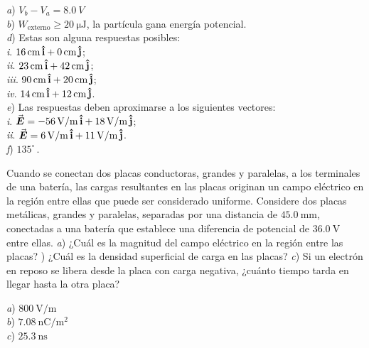 \begin{Answer}
	\begin{minipage}[t]{.4\textwidth}
    \textit{a}) $V_b-V_a = \SI{8.0}{V}$\\
    \textit{b}) $W_\text{externo} \geq \SI{20}{\micro\joule}$, la partícula gana energía potencial.\\
    \textit{d}) Estas son alguna respuestas posibles:\\
    \textit{i}. $\SI{16}{cm}\,\vu{i} + \SI{0}{cm}\,\vu{j}$;\\
    \textit{ii}. $\SI{23}{cm}\,\vu{i} + \SI{42}{cm}\,\vu{j}$;\\
    \textit{iii}. $\SI{90}{cm}\,\vu{i} + \SI{20}{cm}\,\vu{j}$;\\
    \textit{iv}. $\SI{14}{cm}\,\vu{i} + \SI{12}{cm}\,\vu{j}$.\\
    \textit{e}) Las respuestas deben aproximarse a los siguientes vectores:\\
    \textit{i}. $\va*{E} = \SI{-56}{V/m}\,\vu{i} +\SI{18}{V/m}\,\vu{j}$;\\
    \textit{ii}. $\va*{E} = \SI{6}{V/m}\,\vu{i} +\SI{11}{V/m}\,\vu{j}$.\\
    \textit{f}) $135^\circ\,.$ 
  \end{minipage}
\end{Answer}
%
\begin{Exercise}
  Cuando se conectan dos placas conductoras, grandes y paralelas, a los terminales de una batería, las cargas resultantes en las placas originan un campo eléctrico en la región entre ellas que puede ser considerado uniforme. Considere dos placas metálicas, grandes y paralelas, separadas por una distancia de $\SI{45.0}{\milli\metre}$, conectadas a una batería que establece una diferencia de potencial de $\SI{36.0}{\volt}$ entre ellas. \textit{a}) ¿Cuál es la magnitud del campo eléctrico en la región entre las placas? ) ¿Cuál es la densidad superficial de carga en las placas? \textit{c}) Si un electrón en reposo se libera desde la placa con carga negativa, ¿cuánto tiempo tarda en llegar hasta la otra placa?
\end{Exercise}
\begin{Answer}
	\begin{minipage}[t]{.4\textwidth}
    \textit{a}) $\SI{800}{\volt/\metre}$\\ \textit{b}) $\SI{7.08}{\nano\coulomb/\metre\squared}$\\ \textit{c}) $\SI{25.3}{\nano\second}$
  \end{minipage}
\end{Answer}
